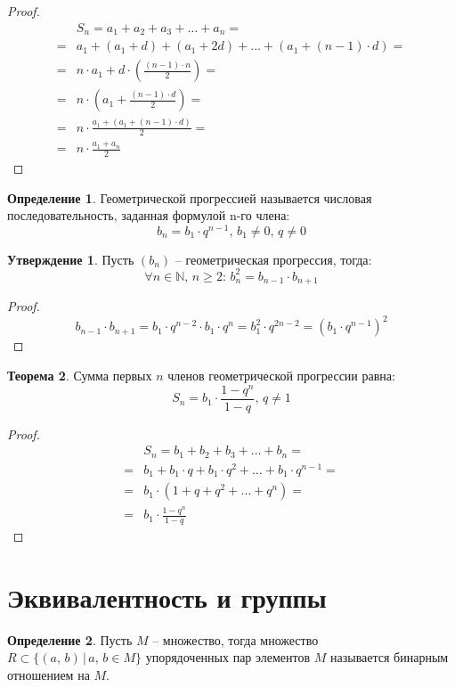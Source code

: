 \documentclass[12pt]{article}
\theoremstyle{definition}
\newtheorem{theorem}{Теорема}[section]
\newtheorem{definition}{Определение}
\newtheorem{statement}[theorem]{Утверждение}
\newcommand{\N}{\mathbb{N}}
\begin{document}
\begin{proof}
    \begin{align*}
        &S_n=a_1+a_2+a_3+\ldots+a_n=\\
        =&a_1+(a_1+d)+(a_1+2d)+\ldots+(a_1+(n-1)\cdot d)=\\
        =&n\cdot a_1+d\cdot \left( \frac{(n-1)\cdot n}{2} \right)=\\
        =&n\cdot \left(a_1+\frac{(n-1)\cdot d}{2} \right)=\\
        =&n \cdot \frac{a_1 + (a_1 + (n-1)\cdot d)}{2}=\\
        =&n\cdot \frac{a_1 + a_n}{2}
    \end{align*}
\end{proof}

\begin{definition}
    Геометрической прогрессией называется числовая последовательность, заданная формулой n-го члена:
    $$b_n=b_1 \cdot q^{n-1},\, b_1\neq0,\, q\neq0$$
\end{definition}

\begin{statement}
    Пусть $(b_n)$ -- геометрическая прогрессия, тогда: 
    $$\forall n\in \N,\, n\geq 2:\,b_n^2=b_{n-1}\cdot b_{n+1}$$
\end{statement}
\begin{proof}
    $$b_{n-1}\cdot b_{n+1}=b_1\cdot q^{n-2}\cdot b_1 \cdot q^n=b_1^2\cdot q^{2n-2}=(b_1\cdot q^{n-1})^2$$
\end{proof}
\begin{theorem}
    Сумма первых $n$ членов геометрической прогрессии равна:
    $$S_n=b_1\cdot \frac{1-q^n}{1-q},\, q\neq 1$$
\end{theorem}
\begin{proof}
    \begin{align*}
        &S_n=b_1+b_2+b_3+\ldots+b_n=\\
        =&b_1+b_1\cdot q+b_1\cdot q^2+\ldots+b_1\cdot q^{n-1}=\\
        =&b_1\cdot(1+q+q^2+\ldots+q^n)=\\
        =&b_1\cdot \frac{1-q^n}{1-q}
    \end{align*}
\end{proof}

\section{Эквивалентность и группы}

\begin{definition}
    Пусть $M$ -- множество, тогда множество $R \subset \{(a,\,b)\,|\,a,\,b\in M\}$ упорядоченных пар элементов $M$ называется бинарным отношением на $M$. 
\end{definition}
\end{document}

